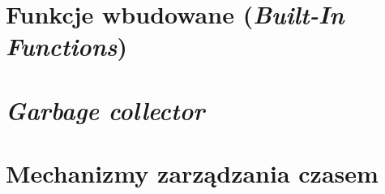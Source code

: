 \section{Funkcje wbudowane (\emph{Built-In Functions})}
\label{sec:maszynaBIF}

\section{\emph{Garbage collector}}
\label{sec:maszynaGC}

\section{Mechanizmy zarządzania czasem}
\label{sec:maszynaTimer}